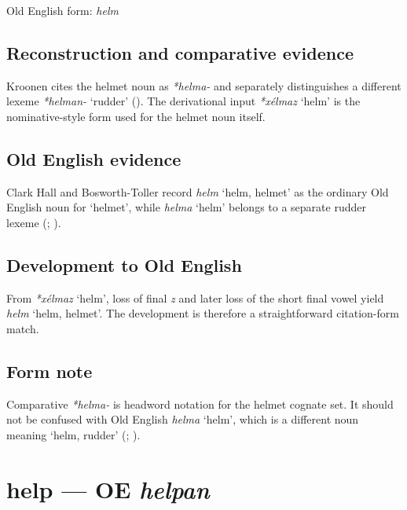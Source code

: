 \documentclass[
  british,
  a4paper,
  openany]{book}
\providecommand{\Recon}[1]{\emph{*#1}}
{\catcode`→=\active \global\def→{\ensuremath{\rightarrow}}}
\providecommand{\texorpdfstring}[2]{#1}
\providecommand{\Recon}[1]{\emph{*#1}}
{\catcode`→=\active \global\def→{\ensuremath{\rightarrow}}}
\begin{document}
Old English form: \emph{helm}

\subsection{Reconstruction and comparative
evidence}\label{reconstruction-and-comparative-evidence-28}

Kroonen cites the helmet noun as \emph{*helma-} and separately
distinguishes a different lexeme \emph{*helman-} `rudder'
(). The derivational input
\Recon{xélmaz} `helm' is the nominative-style form used for the helmet
noun itself.

\subsection{Old English evidence}\label{old-english-evidence-28}

Clark Hall and Bosworth-Toller record {\emph{helm}} `helm, helmet' as
the ordinary Old English noun for `helmet', while {\emph{helma}} `helm'
belongs to a separate rudder lexeme (; ).

\subsection{Development to Old
English}\label{development-to-old-english-28}

From \Recon{xélmaz} `helm', loss of final \emph{z} and later loss of the
short final vowel yield {\emph{helm}} `helm, helmet'. The development is
therefore a straightforward citation-form match.

\subsection{Form note}\label{form-note-7}

Comparative \emph{*helma-} is headword notation for the helmet cognate
set. It should not be confused with Old English {\emph{helma}} `helm',
which is a different noun meaning `helm, rudder'
(;
).

\section{\texorpdfstring{help --- OE
\emph{helpan}}{help --- OE helpan}}\label{help-oe-helpan}
\end{document}
